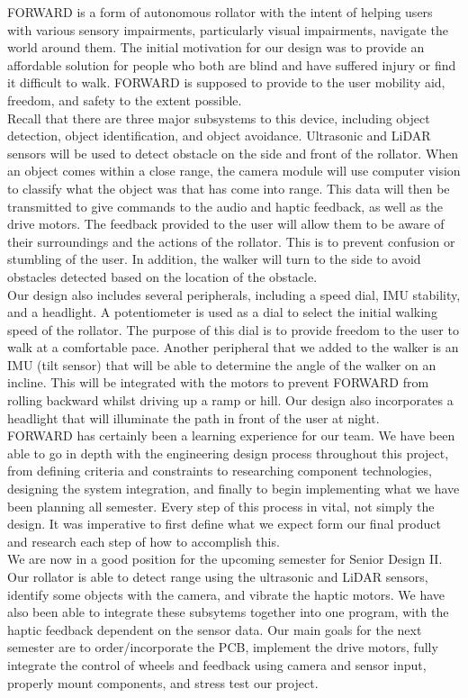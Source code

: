 \noindent FORWARD is a form of autonomous rollator with the intent of helping users with various sensory impairments, particularly visual impairments, navigate the world around them. The initial motivation for our design was to provide an affordable solution for people who both are blind and have suffered injury or find it difficult to walk. FORWARD is supposed to provide to the user mobility aid, freedom, and safety to the extent possible.\\

\noindent Recall that there are three major subsystems to this device, including object detection, object identification, and object avoidance. Ultrasonic and LiDAR sensors will be used to detect obstacle on the side and front of the rollator. When an object comes within a close range, the camera module will use computer vision to classify what the object was that has come into range. This data will then be transmitted to give commands to the audio and haptic feedback, as well as the drive motors. The feedback provided to the user will allow them to be aware of their surroundings and the actions of the rollator. This is to prevent confusion or stumbling of the user. In addition, the walker will turn to the side to avoid obstacles detected based on the location of the obstacle.\\

\noindent Our design also includes several peripherals, including a speed dial, IMU stability, and a headlight. A potentiometer is used as a dial to select the initial walking speed of the rollator. The purpose of this dial is to provide freedom to the user to walk at a comfortable pace. Another peripheral that we added to the walker is an IMU (tilt sensor) that will be able to determine the angle of the walker on an incline. This will be integrated with the motors to prevent FORWARD from rolling backward whilst driving up a ramp or hill. Our design also incorporates a headlight that will illuminate the path in front of the user at night.\\

\noindent FORWARD has certainly been a learning experience for our team. We have been able to go in depth with the engineering design process throughout this project, from defining criteria and constraints to researching component technologies, designing the system integration, and finally to begin implementing what we have been planning all semester. Every step of this process in vital, not simply the design. It was imperative to first define what we expect form our final product and research each step of how to accomplish this.\\

\noindent We are now in a good position for the upcoming semester for Senior Design II. Our rollator is able to detect range using the ultrasonic and LiDAR sensors, identify some objects with the camera, and vibrate the haptic motors. We have also been able to integrate these subsytems together into one program, with the haptic feedback dependent on the sensor data. Our main goals for the next semester are to order/incorporate the PCB, implement the drive motors, fully integrate the control of wheels and feedback using camera and sensor input, properly mount components, and stress test our project.